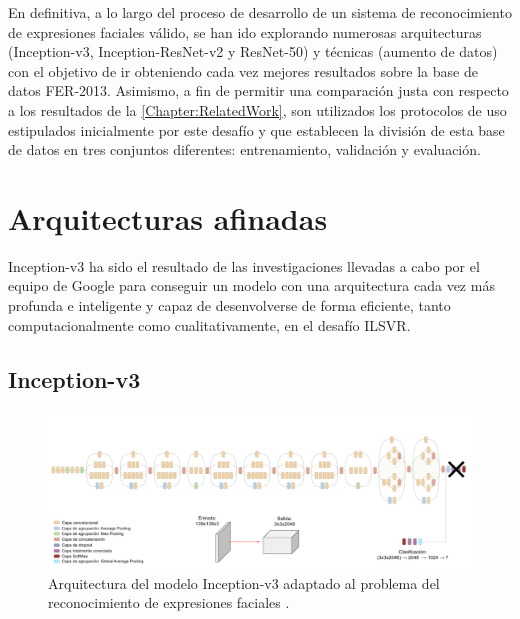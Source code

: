 En definitiva, a lo largo del proceso de desarrollo de un sistema de reconocimiento de expresiones faciales válido, se han ido explorando numerosas arquitecturas (Inception-v3, Inception-ResNet-v2 y ResNet-50) y técnicas (aumento de datos) con el objetivo de ir obteniendo cada vez mejores resultados sobre la base de datos FER-2013. Asimismo, a fin de permitir una comparación justa con respecto a los resultados de la \autoref{Chapter:RelatedWork}, son utilizados los protocolos de uso estipulados inicialmente por este desafío y que establecen la división de esta base de datos en tres conjuntos diferentes: entrenamiento, validación y evaluación.

\section{Arquitecturas afinadas}

Inception-v3 ha sido el resultado de las investigaciones llevadas a cabo por el equipo de Google para conseguir un modelo con una arquitectura cada vez más profunda e inteligente y capaz de desenvolverse de forma eficiente, tanto computacionalmente como cualitativamente, en el desafío ILSVR.

\subsection{Inception-v3}

\begin{figure}
    \centering
    \includegraphics[width=\textwidth]{Images/Inception-v3.png}
    \caption{Arquitectura del modelo Inception-v3 adaptado al problema del reconocimiento de expresiones faciales \cite{img:Inception-v3}.}
    \label{fig:Inception-v3}
\end{figure}

